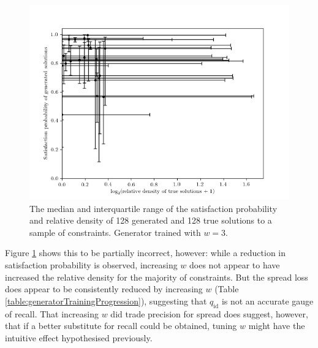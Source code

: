 \documentclass[../../main.tex]{subfiles}
\begin{document}
\begin{figure}[H]
    \begin{center}
    \includegraphics[width=\textwidth]{solutionPropertiesW3}
    \caption{
        The median and interquartile range of the satisfaction probability and relative density of 128 generated and 128 true solutions to a sample of constraints.
        Generator trained with $w=3$.
    }
    \label{fig:solutionPropertiesW3}
    \end{center}
\end{figure}
Figure \ref{fig:solutionPropertiesW3} shows this to be partially incorrect, however: while a reduction in satisfaction probability is observed, increasing $w$ does not appear to have increased the relative density for the majority of constraints.
But the spread loss does appear to be consistently reduced by increasing $w$ (Table \ref{table:generatorTrainingProgression}), suggesting that $q_\text{id}$ is not an accurate gauge of recall.
That increasing $w$ did trade precision for spread does suggest, however, that if a better substitute for recall could be obtained, tuning $w$ might have the intuitive effect hypothesised previously.
\end{document}
